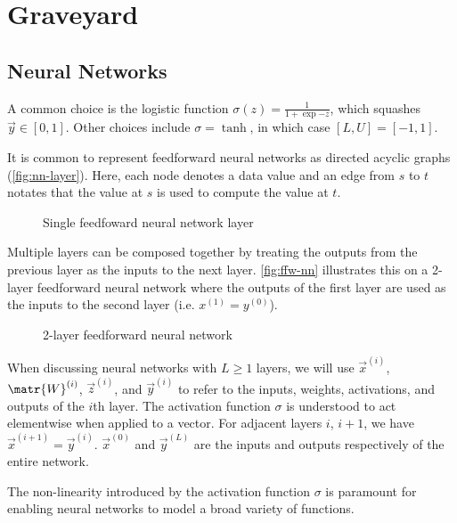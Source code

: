 \chapter{Graveyard}

\section{Neural Networks}

A common choice is the logistic function $\sigma(z)
= \frac{1}{1+\exp{-z}}$, which squashes $\vec{y} \in [0, 1]$. Other choices
include $\sigma = \tanh$, in which case $[L, U] = [-1, 1]$.

It is common to represent feedforward neural networks as directed acyclic
graphs (\autoref{fig:nn-layer}). Here, each node denotes a data value and
an edge from $s$ to $t$ notates that the value at $s$ is used to compute the
value at $t$.

\begin{figure}[htpb]
    \centering
    
    \caption{Single feedfoward neural network layer}
    \label{fig:nn-layer}
\end{figure}

Multiple layers can be composed together by treating the outputs from the previous layer
as the inputs to the next layer. \autoref{fig:ffw-nn} illustrates this on a 2-layer
feedforward neural network where the outputs of the first layer are used as the
inputs to the second layer (i.e. $x^{(1)} = y^{(0)}$).


\begin{figure}[htbp]
    \centering
    
    \caption{2-layer feedforward neural network}
    \label{fig:ffw-nn}
\end{figure}

When discussing neural networks with $L \geq 1$ layers, we will use
$\vec{x}^{(i)}$, $\matr{W}^{(i)}$, $\vec{z}^{(i)}$, and $\vec{y}^{(i)}$ to
refer to the inputs, weights, activations, and outputs of the $i$th layer. The
activation function $\sigma$ is understood to act elementwise when applied to a
vector. For adjacent layers $i$, $i+1$, we have $\vec{x}^{(i+1)} =
\vec{y}^{(i)}$. $\vec{x}^{(0)}$ and $\vec{y}^{(L)}$ are the inputs and outputs
respectively of the entire network.

The non-linearity introduced by the activation function $\sigma$ is paramount
for enabling neural networks to model a broad variety of functions. 

